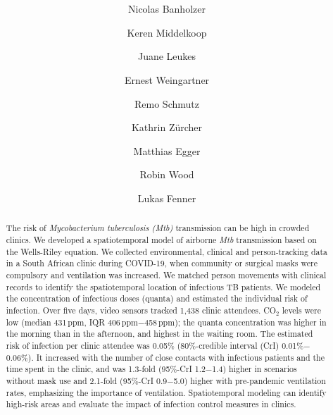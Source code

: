 \documentclass[fleqn,11pt]{wlscirep}
\begin{document}
\doublespacing

\title{\bfseries\LARGE{}}
\author[1]{Nicolas Banholzer}
\author[2]{Keren Middelkoop}
\author[2]{Juane Leukes}
\author[3]{Ernest Weingartner}
\author[1]{Remo Schmutz}
\author[1]{Kathrin Zürcher}
\author[1,4,5]{Matthias Egger}
\author[2]{Robin Wood}
\author[1*]{Lukas Fenner}



\vspace{1em}


\begin{abstract}\normalfont
The risk of \emph{Mycobacterium tuberculosis (Mtb)} transmission can be high in crowded clinics. We developed a spatiotemporal model of airborne \emph{Mtb} transmission based on the Wells-Riley equation. We collected environmental, clinical and person-tracking data in a South African clinic during COVID-19, when community or surgical masks were compulsory and ventilation was increased. We matched person movements with clinical records to identify the spatiotemporal location of infectious TB patients. We modeled the concentration of infectious doses (quanta) and estimated the individual risk of infection. Over five days, video sensors tracked 1,438 clinic attendees. CO$_2$ levels were low (median 431\,ppm, IQR 406\,ppm$-$458\,ppm); the quanta concentration was higher in the morning than in the afternoon, and highest in the waiting room. The estimated risk of infection per clinic attendee was 0.05\% (80\%-credible interval (CrI) 0.01\%$-$0.06\%). It increased with the number of close contacts with infectious patients and the time spent in the clinic, and was 1.3-fold (95\%-CrI 1.2$-$1.4) higher in scenarios without mask use and 2.1-fold (95\%-CrI 0.9$-$5.0) higher with pre-pandemic ventilation rates, emphasizing the importance of ventilation. Spatiotemporal modeling can identify high-risk areas and evaluate the impact of infection control measures in clinics.

\par
\end{abstract}
\end{document}
